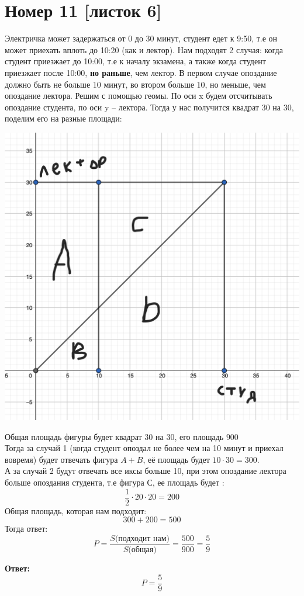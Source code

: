 \documentclass[a4paper,12pt]{article}
\begin{document}
\section*{Номер 11 [листок 6]}
Электричка может задержаться от 0 до 30 минут, студент едет к 9:50, т.е он может приехать вплоть до 10:20 (как и лектор). Нам подходят 2 случая: когда студент приезжает до 10:00, т.е к началу экзамена, а также когда студент приезжает после 10:00, \textbf{но раньше}, чем лектор. В первом случае опоздание должно быть не больше 10 минут, во втором больше 10, но меньше, чем опоздание лектора. Решим с помощью геомы. По оси x будем отсчитывать опоздание студента, по оси y  -- лектора. Тогда у нас получится квадрат 30 на 30, поделим его на разные площади:
\begin{center}
\includegraphics[scale=0.3]{2.png}
\end{center}
Общая площадь фигуры будет квадрат 30 на 30, его площадь $900$
\\
Тогда за случай 1 (когда студент опоздал не более чем на 10 минут и приехал вовремя) будет отвечать фигура $A + B$, её площадь будет $10 \cdot 30 = 300$.
\\
А за случай 2 будут отвечать все иксы больше 10, при этом опоздание лектора больше опоздания студента, т.е фигура С, ее площадь будет :
\[
\frac12 \cdot 20 \cdot 20 = 200
\]
Общая площадь, которая нам подходит:
\[
300 + 200 = 500
\]
Тогда ответ:
\[
P = \frac{S\text{(подходит нам)}}{S(\text{общая)}} = \frac{500}{900} = \frac59
\]
\begin{center}
\textbf{Ответ: } 
\[
P = \frac59
\]
\end{center}
\end{document}
